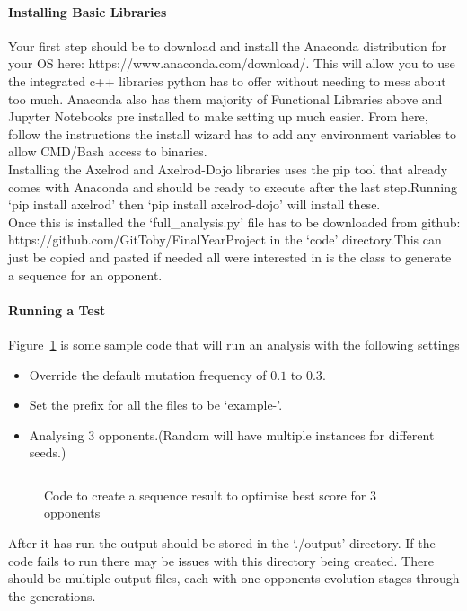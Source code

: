 \paragraph{Installing Basic Libraries}
Your first step should be to download and install the Anaconda distribution for your OS here: https://www.anaconda.com/download/.
This will allow you to use the integrated c++ libraries python has to offer without needing to mess about too much.
Anaconda also has them majority of Functional Libraries above and Jupyter Notebooks pre installed to make setting up much easier.
From here, follow the instructions the install wizard has to add any environment variables to allow CMD/Bash access to binaries.\\ 

Installing the Axelrod and Axelrod-Dojo libraries uses the pip tool that already comes with Anaconda and should be ready to execute after the last step.Running `pip install axelrod' then `pip install axelrod-dojo' will install these.\\

Once this is installed the `full\_analysis.py' file has to be downloaded from github: https://github.com/GitToby/FinalYearProject in the `code' directory.This can just be copied and pasted if needed all were interested in is the class to generate a sequence for an opponent.

\paragraph{Running a Test}
Figure~\ref{code:analysisExample} is some sample code that will run an analysis with the following settings
\begin{itemize}
    \item Override the default mutation frequency of \(0.1\) to \(0.3\).
    \item Set the prefix for all the files to be `example-'.
    \item Analysing 3 opponents.(Random will have multiple instances for different seeds.) 
\end{itemize}
\begin{figure}[h]
    \centering
    \inputminted{python}{code_snippets/analysisExample.py}
    \caption{Code to create a sequence result to optimise best score for 3 opponents}\label{code:analysisExample}
\end{figure}

After it has run the output should be stored in the `./output' directory.
If the code fails to run there may be issues with this directory being created.
There should be multiple output files, each with one opponents evolution stages through the generations.

